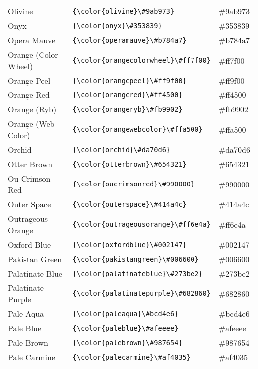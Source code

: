 \documentclass[9.5pt]{article}
\begin{document}
\begin{longtable}{l | l | l}
	Olivine & \verb!{\color{olivine}\#9ab973}! & {\color{olivine}\#9ab973}\\
	Onyx & \verb!{\color{onyx}\#353839}! & {\color{onyx}\#353839}\\
	Opera Mauve & \verb!{\color{operamauve}\#b784a7}! & {\color{operamauve}\#b784a7}\\
	Orange (Color Wheel) & \verb!{\color{orangecolorwheel}\#ff7f00}! & {\color{orangecolorwheel}\#ff7f00}\\
	Orange Peel & \verb!{\color{orangepeel}\#ff9f00}! & {\color{orangepeel}\#ff9f00}\\
	Orange-Red & \verb!{\color{orangered}\#ff4500}! & {\color{orangered}\#ff4500}\\
	Orange (Ryb) & \verb!{\color{orangeryb}\#fb9902}! & {\color{orangeryb}\#fb9902}\\
	Orange (Web Color) & \verb!{\color{orangewebcolor}\#ffa500}! & {\color{orangewebcolor}\#ffa500}\\
	Orchid & \verb!{\color{orchid}\#da70d6}! & {\color{orchid}\#da70d6}\\
	Otter Brown & \verb!{\color{otterbrown}\#654321}! & {\color{otterbrown}\#654321}\\
	Ou Crimson Red & \verb!{\color{oucrimsonred}\#990000}! & {\color{oucrimsonred}\#990000}\\
	Outer Space & \verb!{\color{outerspace}\#414a4c}! & {\color{outerspace}\#414a4c}\\
	Outrageous Orange & \verb!{\color{outrageousorange}\#ff6e4a}! & {\color{outrageousorange}\#ff6e4a}\\
	Oxford Blue & \verb!{\color{oxfordblue}\#002147}! & {\color{oxfordblue}\#002147}\\
	Pakistan Green & \verb!{\color{pakistangreen}\#006600}! & {\color{pakistangreen}\#006600}\\
	Palatinate Blue & \verb!{\color{palatinateblue}\#273be2}! & {\color{palatinateblue}\#273be2}\\
	Palatinate Purple & \verb!{\color{palatinatepurple}\#682860}! & {\color{palatinatepurple}\#682860}\\
	Pale Aqua & \verb!{\color{paleaqua}\#bcd4e6}! & {\color{paleaqua}\#bcd4e6}\\
	Pale Blue & \verb!{\color{paleblue}\#afeeee}! & {\color{paleblue}\#afeeee}\\
	Pale Brown & \verb!{\color{palebrown}\#987654}! & {\color{palebrown}\#987654}\\
	Pale Carmine & \verb!{\color{palecarmine}\#af4035}! & {\color{palecarmine}\#af4035}\\

\end{longtable}
\end{document}
